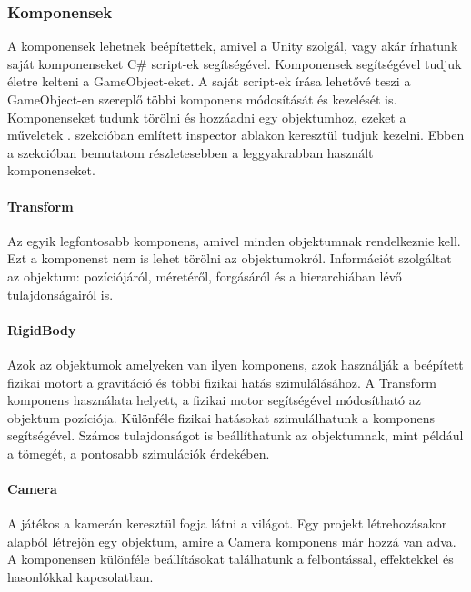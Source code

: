 \documentclass[]{thesis-ekf}
\theoremstyle{definition}
\theoremstyle{remark}
\begin{document}
\subsubsection{Komponensek}

A komponensek lehetnek beépítettek, amivel a Unity szolgál, vagy akár írhatunk saját komponenseket C\# script-ek segítségével. Komponensek segítségével tudjuk életre kelteni a GameObject-eket. A saját script-ek írása lehetővé teszi a GameObject-en szereplő többi komponens módosítását és kezelését is. Komponenseket tudunk törölni és hozzáadni egy objektumhoz, ezeket a műveletek . szekcióban említett inspector ablakon keresztül tudjuk kezelni. Ebben a szekcióban bemutatom részletesebben a leggyakrabban használt komponenseket. \cite{UnityComponents}

\paragraph{Transform}

Az egyik legfontosabb komponens, amivel minden objektumnak rendelkeznie kell. Ezt a komponenst nem is lehet törölni az objektumokról. Információt szolgáltat az objektum: pozíciójáról, méretéről, forgásáról és a hierarchiában lévő tulajdonságairól is. \cite{UnityTransform}
	
\paragraph{RigidBody}

Azok az objektumok amelyeken van ilyen komponens, azok használják a beépített fizikai motort a gravitáció és többi fizikai hatás szimulálásához. A Transform komponens használata helyett, a fizikai motor segítségével módosítható az objektum pozíciója. Különféle fizikai hatásokat szimulálhatunk a komponens segítségével. Számos tulajdonságot is beállíthatunk az objektumnak, mint például a tömegét, a pontosabb szimulációk érdekében. \cite{UnityRigidbody}

\paragraph{Camera}

A játékos a kamerán keresztül fogja látni a világot. Egy projekt létrehozásakor alapból létrejön egy objektum, amire a Camera komponens már hozzá van adva. A komponensen különféle beállításokat találhatunk a felbontással, effektekkel és hasonlókkal kapcsolatban. \cite{UnityCamera}
\end{document}
